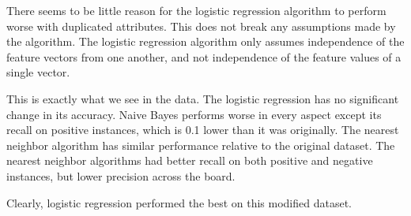 \documentclass[11pt]{article}
\begin{document}
\begin{enumerate}
\begin{enumerate}
    There seems to be little reason for the logistic regression algorithm to
    perform worse with duplicated attributes. This does not break any
    assumptions made by the algorithm. The logistic regression algorithm
    only assumes independence of the feature vectors from one another, and
    not independence of the feature values of a single vector.

    This is exactly what we see in the data. The logistic regression has no
    significant change in its accuracy. Naive Bayes performs worse in every
    aspect except its recall on positive instances, which is 0.1 lower than
    it was originally. The nearest neighbor algorithm has similar performance
    relative to the original dataset. The nearest neighbor algorithms had
    better recall on both positive and negative instances, but lower
    precision across the board.

    Clearly, logistic regression performed the best on this modified dataset.
    


\end{enumerate}
\end{enumerate}
\end{document}
